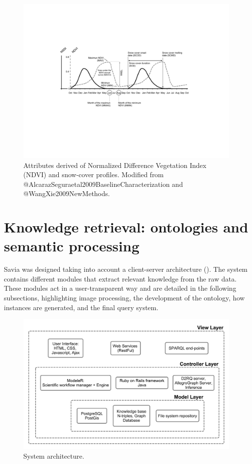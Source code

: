 \begin{figure}
    \centering
    \includegraphics[width=\textwidth]{img/onto/onto-figure-indicators}\caption{Attributes derived of Normalized Difference Vegetation Index (NDVI) and snow-cover profiles. Modified from @AlcarazSeguraetal2009BaselineCharacterization and @WangXie2009NewMethods.}\label{fig:indicator}
\end{figure}

\section{Knowledge retrieval: ontologies and semantic processing}\label{sec:onto:Semantic}

Savia was designed taking into account a client-server architecture (). The system contains different modules that extract relevant knowledge from the raw data. These modules act in a user-transparent way and are detailed in the following subsections, highlighting image processing, the development of the ontology, how instances are generated, and the final query system.

\begin{figure}
    \centering
    \includegraphics[width=\textwidth]{img/onto/onto-architecture}\caption{System architecture.}\label{fig:architecture}
\end{figure}

